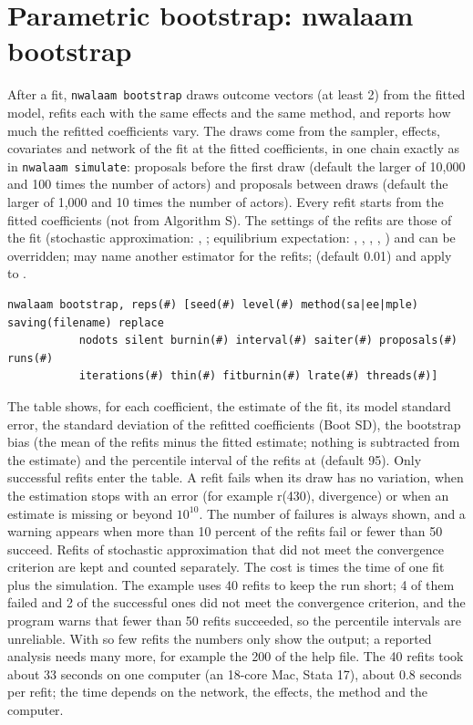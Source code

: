 \section{Parametric bootstrap: nwalaam bootstrap}\label{sec:bootstrap}

After a fit, \texttt{nwalaam bootstrap} draws  outcome vectors (at least 2) from the fitted model, refits each with the same effects and the same method, and reports how much the refitted coefficients vary. The draws come from the sampler, effects, covariates and network of the fit at the fitted coefficients, in one chain exactly as in \texttt{nwalaam simulate}:  proposals before the first draw (default the larger of 10,000 and 100 times the number of actors) and  proposals between draws (default the larger of 1,000 and 10 times the number of actors). Every refit starts from the fitted coefficients (not from Algorithm S). The settings of the refits are those of the fit (stochastic approximation: , ; equilibrium expectation: , , , , ) and can be overridden;  may name another estimator for the refits;  (default 0.01) and  apply to .

\begin{lstlisting}
nwalaam bootstrap, reps(#) [seed(#) level(#) method(sa|ee|mple) saving(filename) replace
           nodots silent burnin(#) interval(#) saiter(#) proposals(#) runs(#)
           iterations(#) thin(#) fitburnin(#) lrate(#) threads(#)]
\end{lstlisting}

The table shows, for each coefficient, the estimate of the fit, its model standard error, the standard deviation of the refitted coefficients (Boot SD), the bootstrap bias (the mean of the refits minus the fitted estimate; nothing is subtracted from the estimate) and the percentile interval of the refits at  (default 95). Only successful refits enter the table. A refit fails when its draw has no variation, when the estimation stops with an error (for example r(430), divergence) or when an estimate is missing or beyond $10^{10}$. The number of failures is always shown, and a warning appears when more than 10 percent of the refits fail or fewer than 50 succeed. Refits of stochastic approximation that did not meet the convergence criterion are kept and counted separately. The cost is  times the time of one fit plus the simulation.
The example uses 40 refits to keep the run short; 4 of them failed and 2 of the successful ones did not meet the convergence criterion, and the program warns that fewer than 50 refits succeeded, so the percentile intervals are unreliable. With so few refits the numbers only show the output; a reported analysis needs many more, for example the 200 of the help file. The 40 refits took about 33 seconds on one computer (an 18-core Mac, Stata 17), about 0.8 seconds per refit; the time depends on the network, the effects, the method and the computer.

